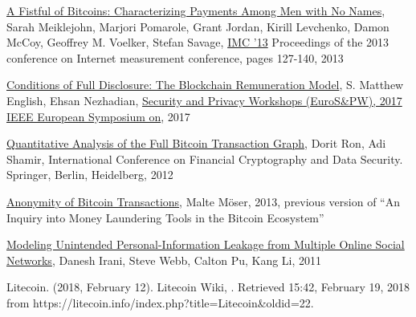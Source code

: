 \begin{thebibliography}{1}
\href{https://cseweb.ucsd.edu/~smeiklejohn/files/imc13.pdf}{A Fistful of
Bitcoins: Characterizing Payments Among Men with No Names}, Sarah Meiklejohn,
Marjori Pomarole, Grant Jordan, Kirill Levchenko, Damon McCoy, Geoffrey M.
Voelker, Stefan Savage, 
\href{http://www.sigcomm.org/events/imc-conference/}{IMC '13} Proceedings of
the 2013 conference on Internet measurement conference, pages 127-140, 2013

\href{http://ieeexplore.ieee.org/document/7966972/}{Conditions of Full
Disclosure: The Blockchain Remuneration Model}, S. Matthew English, 
Ehsan Nezhadian,
\href{http://ieeexplore.ieee.org/xpl/mostRecentIssue.jsp?punumber=7966454}
{Security and Privacy Workshops (EuroS\&PW), 2017 IEEE European Symposium on},
2017

\href{http://arimoto.lolipop.jp/584.pdf}{Quantitative Analysis of the Full
Bitcoin Transaction Graph}, Dorit Ron, Adi Shamir, International Conference on
Financial Cryptography and Data Security. Springer, Berlin, Heidelberg, 2012

\bibitem{}
\href{https://www.wi.uni-muenster.de/sites/wi/files/public/department/itsecurity/mbc13/mbc13-moeser-paper.pdf}
{Anonymity of Bitcoin Transactions}, Malte Möser, 2013, previous version of
``An Inquiry into Money Laundering Tools in the Bitcoin Ecosystem''

\href{https://www.cc.gatech.edu/projects/doi/Papers/DIrani_InternetComp_2011.pdf
}{Modeling Unintended Personal-Information Leakage from Multiple Online Social
Networks}, Danesh Irani, Steve Webb, Calton Pu, Kang Li, 2011

Litecoin. (2018, February 12). Litecoin Wiki, . Retrieved
15:42, February 19, 2018
from https://litecoin.info/index.php?title=Litecoin&oldid=22. 

\end{thebibliography}

